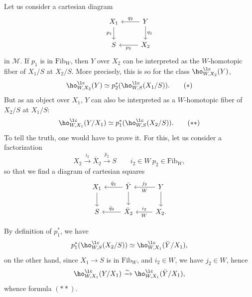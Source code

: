 Let us consider a cartesian diagram
\[
\begin{tikzcd}[ampersand replacement=\&]
X_1 \arrow[d, "p_1"'] \& Y \arrow[l, "q_2"'] \arrow[d, "q_1"] \\
S \& X_2 \arrow[l, "p_2"]
\end{tikzcd}
\]
in $\mathcal{M}$. If $p_1$ is in $\mathrm{Fib}_W$, then $Y$ over $X_2$ can be interpreted as the $W$-homotopic fiber of $X_1/S$ at $X_2/S$. More precisely, this is so for the class $\ho^{\lc}_{W,X_2}(Y)$,
\[
\ho^{\lc}_{W,X_2}(Y) \simeq p_2^*(\ho^{\lc}_{W,S}(X_1/S)). \tag*{$(*)$}
\]
But as an object over $X_1$, $Y$ can also be interpreted as a $W$-homotopic fiber of $X_2/S$ at $X_1/S$:
\[
\ho^{\lc}_{W,X_1}(Y/X_1) \simeq p_1^*(\ho^{\lc}_{W,S}(X_2/S)). \tag*{$(**)$}
\]
To tell the truth, one would have to prove it. For this, let us consider a factorization
\[
X_2 \xrightarrow{i_2} \bar{X}_2 \xrightarrow{\bar{p}_2} S \qquad i_2 \in W\ p_2 \in \mathrm{Fib}_W, %
\]
so that we find a diagram of cartesian squares
\[
\begin{tikzcd}[ampersand replacement=\&]
X_1 \arrow[d] \& \bar{Y} \arrow[l, "\bar{q}_2"'] \arrow[d] \& Y \arrow[l, "j_2"', "W"] \arrow[d] \\
S \& \bar{X}_2 \arrow[l, "\bar{q}_2"'] \& X_2. \arrow[l, "i_2"', "W"] %
\end{tikzcd}
\]

By definition of $p_1^*$, we have
\[
p_1^*(\ho^{\lc}_{W,S}(X_2/S)) \simeq \ho^{\lc}_{W,X_1}(\bar{Y}/X_1),
\]
on the other hand, since $X_1 \longrightarrow S$ is in $\mathrm{Fib}_W$, and $i_2 \in W$, we have $j_2 \in W$, hence
\[
\ho^{\lc}_{W,X_1}(Y/X_1) \xrightarrow{\sim} \ho^{\lc}_{W,X_1}(\bar{Y}/X_1),
\]
whence formula $(**)$.

